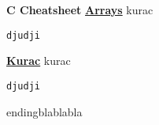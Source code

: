 \documentclass[a4paper]{article}
\begin{document}
\setlength{\columnsep}{1cm}
\setlength{\columnseprule}{0.6pt}





\begin{multicols*}{4}
\textbf{C Cheatsheet} \newline
\textbf{\underline{Arrays}} \newline
\newline
\newline
kurac

\tiny{}
\begin{verbatim}
djudji

\end{verbatim}
\normalsize{}



\vfill
\columnbreak
\textbf{\underline{Kurac}} \newline
\newline
kurac

\tiny{}
\begin{verbatim}
djudji

\end{verbatim}
\normalsize{}
\color{white}endingblablabla
\end{multicols*}
\end{document}
